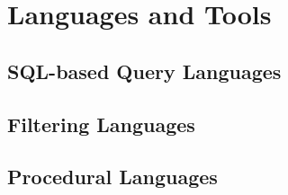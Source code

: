 \chapter{Languages and Tools}\label{ch:languages-and-tools}

\section{SQL-based Query Languages}\label{sec:sql-languages}

\section{Filtering Languages}\label{sec:filtering-languages}

\section{Procedural Languages}\label{sec:procedural-languages}
